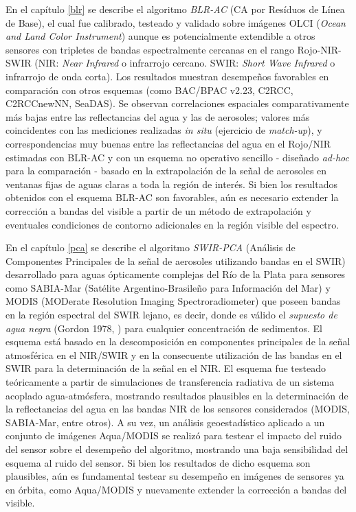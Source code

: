 En el capítulo \ref{blr} se describe el algoritmo \textit{BLR-AC} (CA por Resíduos de Línea de Base), el cual fue calibrado, testeado y validado sobre imágenes OLCI (\textit{Ocean and Land Color Instrument}) aunque es potencialmente extendible a otros sensores con tripletes de bandas espectralmente cercanas en el rango Rojo-NIR-SWIR (NIR: \textit{Near Infrared} o infrarrojo cercano. SWIR: \textit{Short Wave Infrared} o infrarrojo de onda corta). Los resultados muestran desempeños favorables en comparación con otros esquemas (como BAC/BPAC v2.23, C2RCC, C2RCCnewNN, SeaDAS). Se observan correlaciones espaciales comparativamente más bajas entre las reflectancias del agua y las de aerosoles; valores más coincidentes con las mediciones realizadas \textit{in situ} (ejercicio de \textit{match-up}), y correspondencias muy buenas entre las reflectancias del agua en el Rojo/NIR estimadas con BLR-AC y con un esquema no operativo sencillo - diseñado \textit{ad-hoc} para la comparación - basado en la extrapolación de la señal de aerosoles en ventanas fijas de aguas claras a toda la región de interés. Si bien los resultados obtenidos con el esquema BLR-AC son favorables, aún es necesario extender la corrección a bandas del visible a partir de un método de extrapolación y eventuales condiciones de contorno adicionales en la región visible del espectro.

En el capítulo \ref{pca} se describe el algoritmo \textit{SWIR-PCA} (Análisis de Componentes Principales de la señal de aerosoles utilizando bandas en el SWIR) desarrollado para aguas ópticamente complejas del Río de la Plata para sensores como SABIA-Mar (Satélite Argentino-Brasileño para Información del Mar) y MODIS (MODerate Resolution Imaging Spectroradiometer) que poseen bandas en la región espectral del SWIR lejano, es decir, donde es válido el \textit{supuesto de agua negra} (Gordon 1978, \cite{gordon1978}) para cualquier concentración de sedimentos. El esquema está basado en la descomposición en componentes principales de la señal atmosférica en el NIR/SWIR y en la consecuente utilización de las bandas en el SWIR para la determinación de la señal en el NIR. El esquema fue testeado teóricamente a partir de simulaciones de transferencia radiativa de un sistema acoplado agua-atmósfera, mostrando resultados plausibles en la determinación de la reflectancias del agua en las bandas NIR de los sensores considerados (MODIS, SABIA-Mar, entre otros). A su vez, un análisis geoestadístico aplicado a un conjunto de imágenes Aqua/MODIS se realizó para testear el impacto del ruido del sensor sobre el desempeño del algoritmo, mostrando una baja sensibilidad del esquema al ruido del sensor. Si bien los resultados de dicho esquema son plausibles, aún es fundamental testear su desempeño en imágenes de sensores ya en órbita, como Aqua/MODIS y nuevamente extender la corrección a bandas del visible.


